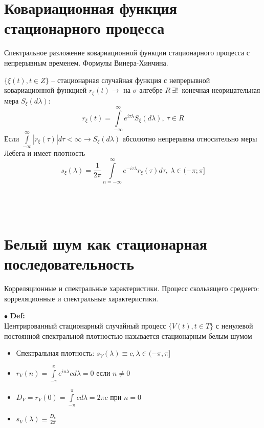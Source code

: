 \documentclass[11pt]{article}
\begin{document}
\section{Ковариационная функция стационарного процесса}
\begin{center}Спектральное разложение ковариационной функции стационарного процесса с непрерывным временем. Формулы Винера-Хинчина.\end{center}
$\{\xi(t), t \in Z\}$ – стационарная случайная функция с непрерывной ковариационной функцией $r_\xi(t) \longrightarrow$ на $\sigma$-алгебре $R \ \exists! \ $ конечная неорицательная мера $S_\xi(d\lambda)$:
$$r_\xi(t) = \int\limits_{-\infty}^{\infty} e^{i\tau\lambda}S_\xi(d\lambda), \ \tau \in R$$
Если $\int\limits_{-\infty}^{\infty} |r_\xi(\tau)|d\tau < \infty \longrightarrow S_\xi(d\lambda)$ абсолютно непрерывна относительно меры Лебега и имеет плотность
$$ s_\xi(\lambda) = \frac{1}{2\pi} \int\limits_{n=-\infty}^{\infty} e^{-i\tau\lambda}r_\xi(\tau)d\tau, \ \lambda \in (-\pi;\pi]$$ \\ \\ \\

\section{Белый шум как стационарная последовательность}
\begin{center}Корреляционные и спектральные характеристики. Процесс скользящего среднего: корреляционные и спектральные характеристики.\end{center}
$\bullet$ \textbf{Def:} \\ Центрированный стационарный случайный процесс $\{V (t), t \in T \}$ с ненулевой постоянной спектральной плотностью называется стационарным белым шумом \\
\begin{itemize}
	\item Спектральная плотность: $s_V(\lambda) \equiv c, \lambda \in(−\pi,\pi]$
	\item $r_V(n) = \int\limits_{-\pi}^{\pi} e^{in\lambda}cd\lambda = 0$ если $n \neq 0$
	\item $D_V =r_V(0)=\int\limits_{-\pi}^{\pi} cd\lambda=2\pi c$ при $ n=0 $
	\item $s_V(\lambda) \equiv \frac{D_V}{2\pi}$
\end{itemize}
\end{document}
